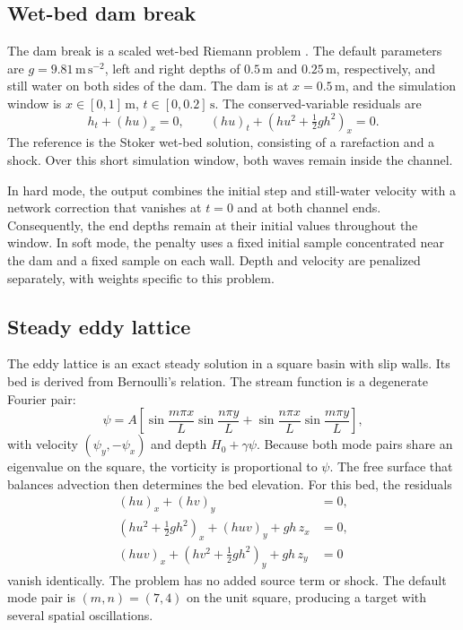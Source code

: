 \documentclass{erdc}
\begin{document}
\subsection{Wet-bed dam break}
\label{sec:dambreak}

The dam break is a scaled wet-bed Riemann problem
\cite{Stoker1957,Delestre2013}. The default parameters are
\(g=9.81\,\mathrm{m\,s^{-2}}\), left and right depths of \(0.5\,\mathrm{m}\)
and \(0.25\,\mathrm{m}\), respectively, and still water on both sides
of the dam. The dam is at \(x=0.5\,\mathrm{m}\), and the simulation
window is \(x\in[0,1]\,\mathrm{m}\), \(t\in[0,0.2]\,\mathrm{s}\). The
conserved-variable residuals are
\begin{equation}
\label{eq:dambreak}
h_{t}+(hu)_{x}=0,
\qquad
(hu)_{t}+\left(hu^{2}+\tfrac{1}{2}gh^{2}\right)_{x}=0.
\end{equation}
The reference is the Stoker wet-bed solution, consisting of a
rarefaction and a shock. Over this short simulation window, both waves
remain inside the channel.

In hard mode, the output combines the initial step and still-water
velocity with a network correction that vanishes at \(t=0\) and at both
channel ends. Consequently, the end depths remain at their initial
values throughout the window. In soft mode, the penalty uses a fixed
initial sample concentrated near the dam and a fixed sample on each
wall. Depth and velocity are penalized separately, with weights specific
to this problem.

\subsection{Steady eddy lattice}
\label{sec:eddies}

The eddy lattice is an exact steady solution in a square basin with slip
walls. Its bed is derived from Bernoulli's relation. The stream function
is a degenerate Fourier pair:
\begin{equation}
\label{eq:eddy-psi}
\psi=A\left[
\sin\frac{m\pi x}{L}\sin\frac{n\pi y}{L}
+\sin\frac{n\pi x}{L}\sin\frac{m\pi y}{L}
\right],
\end{equation}
with velocity \((\psi_{y},-\psi_{x})\) and depth \(H_{0}+\gamma\psi\).
Because both mode pairs share an eigenvalue on the square, the vorticity
is proportional to \(\psi\). The free surface that balances advection
then determines the bed elevation. For this bed, the residuals
\begin{equation}
\label{eq:eddies}
\begin{aligned}
(hu)_{x}+(hv)_{y}&=0,\\
\left(hu^{2}+\tfrac{1}{2}gh^{2}\right)_{x}+(huv)_{y}+gh\,z_{x}&=0,\\
(huv)_{x}+\left(hv^{2}+\tfrac{1}{2}gh^{2}\right)_{y}+gh\,z_{y}&=0
\end{aligned}
\end{equation}
vanish identically. The problem has no added source term or shock. The
default mode pair is \((m,n)=(7,4)\) on the unit square, producing a
target with several spatial oscillations.
\end{document}
